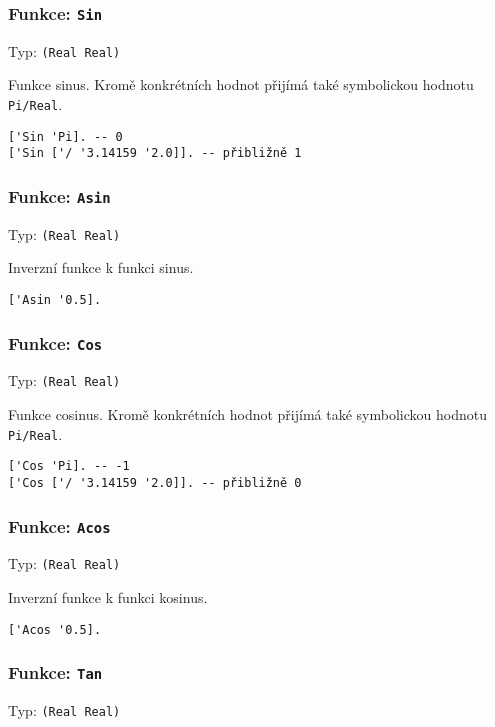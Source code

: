 \subsubsection*{Funkce: \lstinline{Sin}}
Typ: \lstinline{(Real Real)}

Funkce sinus. Kromě konkrétních hodnot přijímá také symbolickou hodnotu \lstinline{Pi/Real}.

\begin{lstlisting}[caption={Ukázka využití Sin}]
['Sin 'Pi]. -- 0
['Sin ['/ '3.14159 '2.0]]. -- přibližně 1
\end{lstlisting}

\subsubsection*{Funkce: \lstinline{Asin}}
Typ: \lstinline{(Real Real)}

Inverzní funkce k funkci sinus.

\begin{lstlisting}[caption={Ukázka využití Asin}]
['Asin '0.5].
\end{lstlisting}

\subsubsection*{Funkce: \lstinline{Cos}}
Typ: \lstinline{(Real Real)}

Funkce cosinus. Kromě konkrétních hodnot přijímá také symbolickou hodnotu \lstinline{Pi/Real}.

\begin{lstlisting}[caption={Ukázka využití Cos}]
['Cos 'Pi]. -- -1
['Cos ['/ '3.14159 '2.0]]. -- přibližně 0
\end{lstlisting}

\subsubsection*{Funkce: \lstinline{Acos}}
Typ: \lstinline{(Real Real)}

Inverzní funkce k funkci kosinus.

\begin{lstlisting}[caption={Ukázka využití Acos}]
['Acos '0.5].
\end{lstlisting}

\subsubsection*{Funkce: \lstinline{Tan}}
Typ: \lstinline{(Real Real)}

